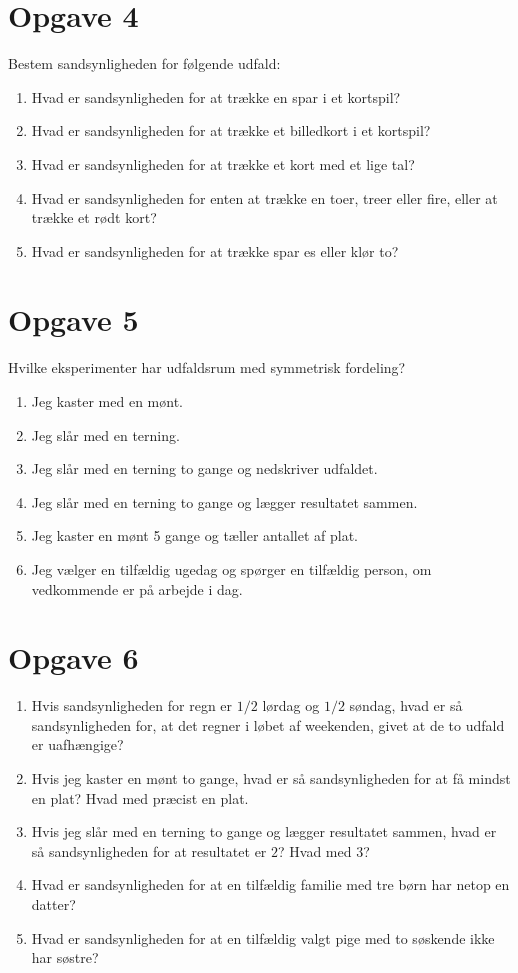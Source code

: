 \section*{Opgave 4}
Bestem sandsynligheden for følgende udfald:
\begin{enumerate}[label=\roman*)]
	\item Hvad er sandsynligheden for at trække en spar i et kortspil?
	\item Hvad er sandsynligheden for at trække et billedkort i et kortspil?
	\item Hvad er sandsynligheden for at trække et kort med et lige tal?
	\item Hvad er sandsynligheden for enten at trække en toer, treer eller fire, eller at trække et rødt kort?
	\item Hvad er sandsynligheden for at trække spar es eller klør to?
\end{enumerate}

\section*{Opgave 5}
Hvilke eksperimenter har udfaldsrum med symmetrisk fordeling?
\begin{enumerate}[label=\roman*)]
\item Jeg kaster med en mønt.
\item Jeg slår med en terning.
\item Jeg slår med en terning to gange og nedskriver udfaldet.
\item Jeg slår med en terning to gange og lægger resultatet sammen.
\item Jeg kaster en mønt 5 gange og tæller antallet af plat.
\item Jeg vælger en tilfældig ugedag og spørger en tilfældig person, om vedkommende er på arbejde i dag. 
\end{enumerate}
\section*{Opgave 6}
\begin{enumerate}[label=\roman*)]
\item Hvis sandsynligheden for regn er $1/2$ lørdag og $1/2$ søndag, hvad er så sandsynligheden for, at det regner i løbet af weekenden, givet at de to udfald er uafhængige?
\item Hvis jeg kaster en mønt to gange, hvad er så sandsynligheden for at få mindst en plat? Hvad med præcist en plat.
\item Hvis jeg slår med en terning to gange og lægger resultatet sammen, hvad er så sandsynligheden for at resultatet er $2$? Hvad med $3$?
\item Hvad er sandsynligheden for at en tilfældig familie med tre børn har netop en datter?
\item Hvad er sandsynligheden for at en tilfældig valgt pige med to søskende ikke har søstre?
\end{enumerate}